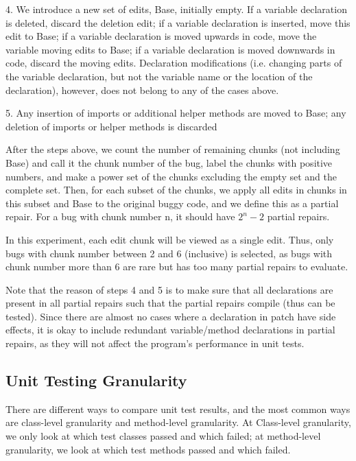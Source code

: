 \documentclass[sigconf, timestamp-false, anonymous=true]{acmart}
\begin{document}
4. We introduce a new set of edits, Base, initially empty. If a variable declaration is deleted, discard the deletion edit; if a variable declaration is inserted, move this edit to Base; if a variable declaration is moved upwards in code, move the variable moving edits to Base; if a variable declaration is moved downwards in code, discard the moving edits. Declaration modifications (i.e. changing parts of the variable declaration, but not the variable name or the location of the declaration), however, does not belong to any of the cases above.

5. Any insertion of imports or additional helper methods are moved to Base; any deletion of imports or helper methods is discarded

After the steps above, we count the number of remaining chunks (not including Base) and call it the chunk number of the bug, label the chunks with positive numbers, and make a power set of the chunks excluding the empty set and the complete set. Then, for each subset of the chunks, we apply all edits in chunks in this subset and Base to the original buggy code, and we define this as a partial repair. For a bug with chunk number n, it should have $2^n-2$ partial repairs. 

In this experiment, each edit chunk will be viewed as a single edit. Thus, only bugs with chunk number between 2 and 6 (inclusive) is selected, as bugs with chunk number more than 6 are rare but has too many partial repairs to evaluate.

Note that the reason of steps 4 and 5 is to make sure that all declarations are present in all partial repairs such that the partial repairs compile (thus can be tested). Since there are almost no cases where a declaration in patch have side effects, it is okay to include redundant variable/method declarations in partial repairs, as they will not affect the program's performance in unit tests. 

\subsection{Unit Testing Granularity}

There are different ways to compare unit test results, and the most common ways are class-level granularity and method-level granularity. At Class-level granularity, we only look at which test classes passed and which failed; at method-level granularity, we look at which test methods passed and which failed.
\end{document}
